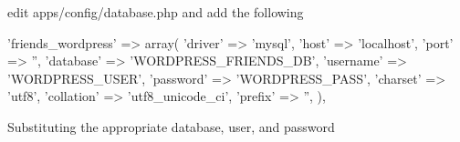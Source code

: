 \begin{DoxyItemize}
\item edit apps/config/database.\+php and add the following 
\begin{DoxyPre}
        'friends\_wordpress' => array(
            'driver'    => 'mysql',
            'host'      => 'localhost',
            'port'      => '', 
            'database'  => 'WORDPRESS\_FRIENDS\_DB',
            'username'  => 'WORDPRESS\_USER',
            'password'  => 'WORDPRESS\_PASS',
            'charset'   => 'utf8',
            'collation' => 'utf8\_unicode\_ci',
            'prefix'    => '', 
        ), 
\end{DoxyPre}
 Substituting the appropriate database, user, and password 
\end{DoxyItemize}